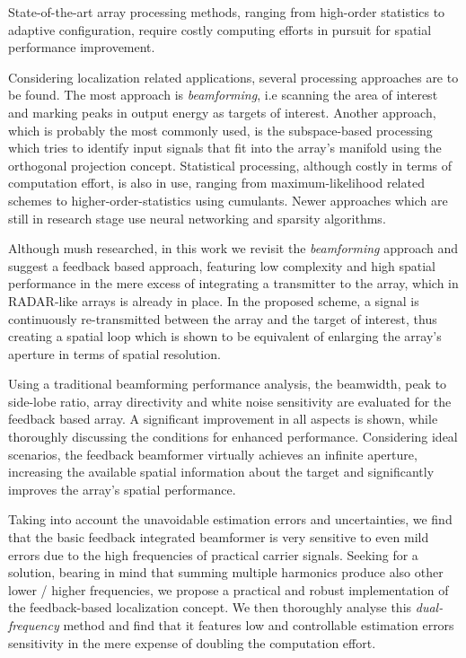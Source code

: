 State-of-the-art array processing methods, ranging from high-order statistics to adaptive configuration, require costly computing efforts in pursuit for spatial performance improvement.
\par 
Considering localization related applications, several processing approaches are to be found. The most approach is \emph{beamforming}, i.e scanning the area of interest and marking peaks in output energy as targets of interest.
Another approach, which is probably the most commonly used, is the subspace-based processing which tries to identify input signals that fit into the array's manifold using the orthogonal projection concept.
Statistical processing, although costly in terms of computation effort, is also in use, ranging from maximum-likelihood related schemes to higher-order-statistics using cumulants.
Newer approaches which are still in research stage use neural networking and sparsity algorithms.
\par
Although mush researched, in this work we revisit the \emph{beamforming} approach and suggest
a feedback based approach, featuring low complexity and high spatial performance in the mere excess of integrating a transmitter to the array, which in RADAR-like arrays is already in place.
In the proposed scheme, a signal is continuously re-transmitted between the array and the target of interest, thus creating a spatial loop which is shown to be equivalent of enlarging the array's aperture in terms of spatial resolution.
\par 
Using a traditional beamforming performance analysis, the beamwidth, peak to side-lobe ratio, array directivity and white noise sensitivity are evaluated for the feedback based array.
A significant improvement in all aspects is shown, while thoroughly discussing the conditions for enhanced performance.
Considering ideal scenarios, the feedback beamformer virtually achieves an infinite aperture, increasing the available spatial information about the target and significantly improves the array's spatial performance.
\par
Taking into account the unavoidable estimation errors and uncertainties, we find that the basic feedback integrated beamformer is very sensitive to even mild errors due to the high frequencies of practical carrier signals.
Seeking for a solution, bearing in mind that summing multiple harmonics produce also other lower / higher frequencies, we propose a practical and robust implementation of the feedback-based localization concept.
We then thoroughly analyse this \emph{dual-frequency} method and find that it features low and controllable estimation errors sensitivity in the mere expense of doubling the computation effort.
